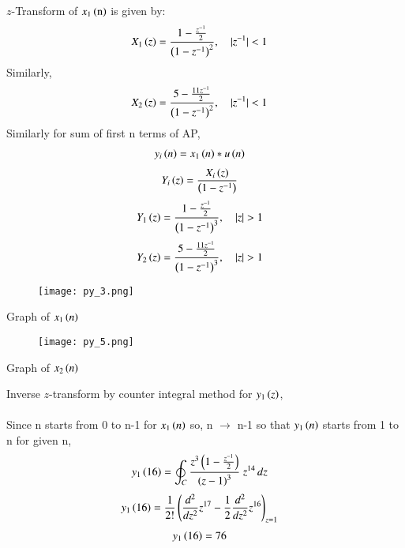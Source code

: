 \documentclass[beamer]{IEEEtran}
\theoremstyle{remark}
\begin{document}
$z$-Transform of $x_1\left(\text{n}\right)$ is given by:
\begin{align} X_1\left(z\right)&=\frac{1-\frac{z^{-1}}{2}}{\left(1-z^{-1}\right)^2},\quad |z^{-1}|<1
\end{align}
Similarly,
\begin{align}X_2\left(z\right)&=\frac{5-\frac{11z^{-1}}{2}}{\left(1-z^{-1}\right)^2},\quad |z^{-1}|<1 \end{align}
Similarly for sum of first n terms of AP,
\begin{align}
y_i\left(n\right)&=x_1\left(n\right)*u\left(n\right)
\end{align}
\begin{align}
\label{w1}
Y_i\left(z\right)&=\frac{X_i\left(z\right)}{\left(1-z^{-1}\right)}
\end{align}
\begin{align}
Y_1\brak{z}&=\frac{1-\frac{z^{-1}}{2}}{\brak{1-z^{-1}}^3},\quad |z|>1
\end{align}
\begin{align}Y_2\brak{z}&=\frac{5-\frac{11z^{-1}}{2}}{\brak{1-z^{-1}}^3},\quad |z|>1\end{align}
\begin{figure}[h]
    \centering
    \texttt{[image: py\_3.png]}
    \label{fig:x1n}
\end{figure}
\begin{center}
    Graph of $x_1\left(n\right)$
\end{center}
\begin{figure}[h]
    \centering
    \texttt{[image: py\_5.png]}
    \label{fig:x2n}
\end{figure}
\begin{center}
    Graph of $x_2\left(n\right)$\\[20ex]
\end{center}
Inverse $z$-transform by counter integral method for  $y_1\left(z\right)$,\\\\Since n starts from 0 to n-1 for $x_1\left(n\right)$ so, n $\to$ n-1 so that $y_1\left(n\right)$ starts from 1 to n for given n,\\
\begin{align}
y_1\left(16\right)&=\oint_C \frac{z^3\left(1-\frac{z^{-1}}{2}\right)}{\left(z-1\right)^3}\ z^{14}\, dz
\end{align}
\begin{align}
y_1\left(16\right)&=\frac{1}{2!}\left(\frac{d^2}{dz^2}z^{17}-\frac{1}{2}\frac{d^2}{dz^2}z^{16}\right)_{z=1}  
\end{align}
\begin{align}
y_1\left(16\right)&=76
\end{align}
\end{document}
